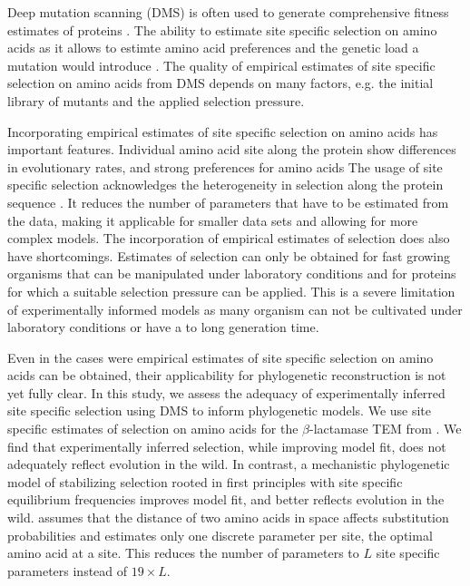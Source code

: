 \documentclass[12pt]{article}
\begin{document}
Deep mutation scanning (DMS) is often used to generate comprehensive fitness estimates of proteins \citep{Fowler2014}.
The ability to estimate site specific selection on amino acids as it allows to estimte amino acid preferences and the genetic load a mutation would introduce \citep{bloom2014,firnberg2014,stiffler2016}.
The quality of empirical estimates of site specific selection on amino acids from DMS depends on many factors, e.g. the initial library of mutants and the applied selection pressure.

Incorporating empirical estimates of site specific selection on amino acids has important features.
Individual amino acid site along the protein show differences in evolutionary rates, and strong preferences for amino acids \citep{HalpernAndBruno1998, ashenberg2013, echave2016}
The usage of site specific selection acknowledges the heterogeneity in selection along the protein sequence \citep{hilton2017}.
It reduces the number of parameters that have to be estimated from the data, making it applicable for smaller data sets and allowing for more complex models.
The incorporation of empirical estimates of selection does also have shortcomings.
Estimates of selection can only be obtained for fast growing organisms that can be manipulated under laboratory conditions and for proteins for which a suitable selection pressure can be applied.
This is a severe limitation of experimentally informed models as many organism can not be cultivated under laboratory conditions or have a to long generation time.

Even in the cases were empirical estimates of site specific selection on amino acids can be obtained, their applicability for phylogenetic reconstruction is not yet fully clear.
In this study, we assess the adequacy of experimentally inferred site specific selection using DMS to inform phylogenetic models.
We use site specific estimates of selection on amino acids for the $\beta$-lactamase TEM from \citet{stiffler2016}.
We find that experimentally inferred selection, while improving model fit, does not adequately reflect evolution in the wild.
In contrast, \selac \citep{beaulieu2018} a mechanistic phylogenetic model of stabilizing selection rooted in first principles with site specific equilibrium frequencies improves model fit, and better reflects evolution in the wild.
\selac assumes that the distance of two amino acids in \PC space affects substitution probabilities and estimates only one discrete parameter per site, the optimal amino acid at a site.
This reduces the number of parameters to $L$ site specific parameters instead of $19\times L$.
\end{document}

